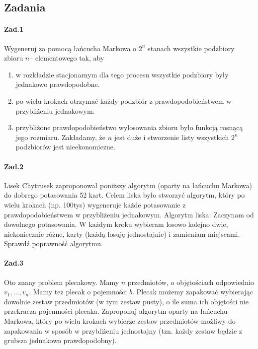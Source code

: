 \documentclass[a4paper,12pt]{article}
\theoremstyle{definition}%
\theoremstyle{definition}
\theoremstyle{problem}
\begin{document}
\subsection{Zadania}
\paragraph{Zad.1} Wygeneruj za pomocą łańcucha Markowa o $2^n$ stanach wszystkie podzbiory zbioru $n$– elementowego tak, aby
\begin{enumerate}[label=\alph*)]
\item w rozkładzie stacjonarnym dla tego procesu wszystkie podzbiory były jednakowo prawdopodobne.
\item po wielu krokach otrzymać każdy podzbiór z prawdopodobieństwem w przybliżeniu jednakowym.
\item przybliżone prawdopodobieństwo wylosowania zbioru było funkcją rosnącą jego rozmiaru.
Zakładamy, że $n$ jest duże i stworzenie listy wszystkich $2^n$ podzbiorów jest nieekonomiczne.
\end{enumerate}

\paragraph{Zad.2} Lisek Chytrusek zaproponował poniższy algorytm (oparty na łańcuchu Markowa) do dobrego potasowania 52 kart. Celem liska było stworzyć algorytm, który po wielu krokach (np. 100tys) wygeneruje każde potasowanie z prawdopodobieństwem w przybliżeniu jednakowym. Algorytm liska: Zaczynam od dowolnego potasowania. W każdym kroku wybieram losowo kolejno dwie, niekoniecznie różne, karty (każdą losuję jednostajnie) i zamieniam miejscami. Sprawdź poprawność algorytmu.

\paragraph{Zad.3} Oto znany problem plecakowy. Mamy $n$ przedmiotów, o objętościach odpowiednio $v_1, . . . , v_n$. Mamy też plecak o pojemności $b$. Plecak możemy zapakować wybierając dowolnie zestaw przedmiotów (w tym zestaw pusty), o ile suma ich objętości nie przekracza pojemności plecaka. Zaproponuj algorytm oparty na łańcuchu Markowa, który po wielu krokach wybierze zestaw przedmiotów możliwy do zapakowania w sposób w przybliżeniu jednostajny (tzn. każdy zestaw będzie z grubsza jednakowo prawdopodobny).
\end{document}

